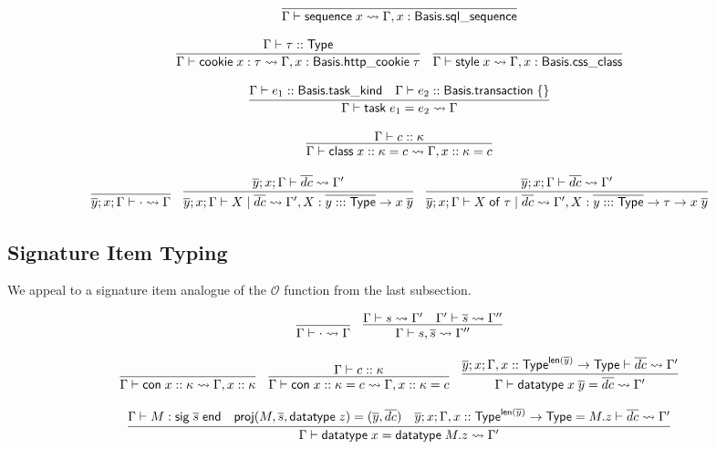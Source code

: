 \documentclass{article}
\newcommand{\mt}[1]{\mathsf{#1}}
\begin{document}
$$\infer{\Gamma \vdash \mt{sequence} \; x \leadsto \Gamma, x : \mt{Basis}.\mt{sql\_sequence}}{}$$

$$\infer{\Gamma \vdash \mt{cookie} \; x : \tau \leadsto \Gamma, x : \mt{Basis}.\mt{http\_cookie} \; \tau}{
  \Gamma \vdash \tau :: \mt{Type}
}
\quad \infer{\Gamma \vdash \mt{style} \; x \leadsto \Gamma, x : \mt{Basis}.\mt{css\_class}}{}$$

$$\infer{\Gamma \vdash \mt{task} \; e_1 = e_2 \leadsto \Gamma}{
  \Gamma \vdash e_1 :: \mt{Basis}.\mt{task\_kind}
  & \Gamma \vdash e_2 :: \mt{Basis}.\mt{transaction} \; \{\}
}$$

$$\infer{\Gamma \vdash \mt{class} \; x :: \kappa = c \leadsto \Gamma, x :: \kappa = c}{
  \Gamma \vdash c :: \kappa
}$$

$$\infer{\overline{y}; x; \Gamma \vdash \cdot \leadsto \Gamma}{}
\quad \infer{\overline{y}; x; \Gamma \vdash X \mid \overline{dc} \leadsto \Gamma', X : \overline{y ::: \mt{Type}} \to x \; \overline{y}}{
  \overline{y}; x; \Gamma \vdash \overline{dc} \leadsto \Gamma'
}
\quad \infer{\overline{y}; x; \Gamma \vdash X \; \mt{of} \; \tau \mid \overline{dc} \leadsto \Gamma', X : \overline{y ::: \mt{Type}} \to \tau \to x \; \overline{y}}{
  \overline{y}; x; \Gamma \vdash \overline{dc} \leadsto \Gamma'
}$$

\subsection{Signature Item Typing}

We appeal to a signature item analogue of the $\mathcal O$ function from the last subsection.

$$\infer{\Gamma \vdash \cdot \leadsto \Gamma}{}
\quad \infer{\Gamma \vdash s, \overline{s} \leadsto \Gamma''}{
  \Gamma \vdash s \leadsto \Gamma'
  & \Gamma' \vdash \overline{s} \leadsto \Gamma''
}$$

$$\infer{\Gamma \vdash \mt{con} \; x :: \kappa \leadsto \Gamma, x :: \kappa}{}
\quad \infer{\Gamma \vdash \mt{con} \; x :: \kappa = c \leadsto \Gamma, x :: \kappa = c}{
  \Gamma \vdash c :: \kappa
}
\quad \infer{\Gamma \vdash \mt{datatype} \; x \; \overline{y} = \overline{dc} \leadsto \Gamma'}{
  \overline{y}; x; \Gamma, x :: \mt{Type}^{\mt{len}(\overline y)} \to \mt{Type} \vdash \overline{dc} \leadsto \Gamma'
}$$

$$\infer{\Gamma \vdash \mt{datatype} \; x = \mt{datatype} \; M.z \leadsto \Gamma'}{
  \Gamma \vdash M : \mt{sig} \; \overline{s} \; \mt{end}
  & \mt{proj}(M, \overline{s}, \mt{datatype} \; z) = (\overline{y}, \overline{dc})
  & \overline{y}; x; \Gamma, x :: \mt{Type}^{\mt{len}(\overline y)} \to \mt{Type} = M.z \vdash \overline{dc} \leadsto \Gamma'
}$$
\end{document}
